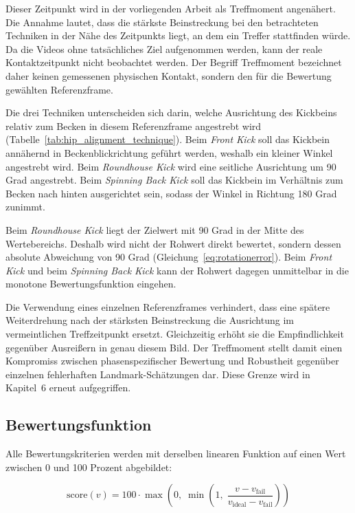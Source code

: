 \documentclass[intern]{cgMA}
\begin{document}
Dieser Zeitpunkt wird in der vorliegenden Arbeit als Treffmoment angenähert. Die Annahme lautet, dass die stärkste Beinstreckung bei den betrachteten Techniken in der Nähe des Zeitpunkts liegt, an dem ein Treffer stattfinden würde. Da die Videos ohne tatsächliches Ziel aufgenommen werden, kann der reale Kontaktzeitpunkt nicht beobachtet werden. Der Begriff Treffmoment bezeichnet daher keinen gemessenen physischen Kontakt, sondern den für die Bewertung gewählten Referenzframe.

Die drei Techniken unterscheiden sich darin, welche Ausrichtung des Kickbeins relativ zum Becken in diesem Referenzframe angestrebt wird (Tabelle~\ref{tab:hip_alignment_technique}). Beim \textit{Front Kick} soll das Kickbein annähernd in Beckenblickrichtung geführt werden, weshalb ein kleiner Winkel angestrebt wird. Beim \textit{Roundhouse Kick} wird eine seitliche Ausrichtung um 90 Grad angestrebt. Beim \textit{Spinning Back Kick} soll das Kickbein im Verhältnis zum Becken nach hinten ausgerichtet sein, sodass der Winkel in Richtung 180 Grad zunimmt.

Beim \textit{Roundhouse Kick} liegt der Zielwert mit 90 Grad in der Mitte des Wertebereichs. Deshalb wird nicht der Rohwert direkt bewertet, sondern dessen absolute Abweichung von 90 Grad (Gleichung~\ref{eq:rotationerror}). Beim \textit{Front Kick} und beim \textit{Spinning Back Kick} kann der Rohwert dagegen unmittelbar in die monotone Bewertungsfunktion eingehen.

Die Verwendung eines einzelnen Referenzframes verhindert, dass eine spätere Weiterdrehung nach der stärksten Beinstreckung die Ausrichtung im vermeintlichen Treffzeitpunkt ersetzt. Gleichzeitig erhöht sie die Empfindlichkeit gegenüber Ausreißern in genau diesem Bild. Der Treffmoment stellt damit einen Kompromiss zwischen phasenspezifischer Bewertung und Robustheit gegenüber einzelnen fehlerhaften Landmark-Schätzungen dar. Diese Grenze wird in Kapitel~6 erneut aufgegriffen.

\subsection{Bewertungsfunktion}
Alle Bewertungskriterien werden mit derselben linearen Funktion auf einen Wert zwischen 0 und 100 Prozent abgebildet:

\begin{equation}
\text{score}(v) = 100 \cdot \max\!\left(0,\; \min\!\left(1,\; \frac{v - v_{\text{fail}}}{v_{\text{ideal}} - v_{\text{fail}}}\right)\right)
\label{eq:score}
\end{equation}
\end{document}
